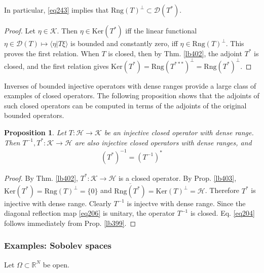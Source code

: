 \documentclass[12pt,b5paper,notitlepage]{article}
\theoremstyle{definition}
\theoremstyle{plain}
\newtheorem{pp}[df]{Proposition}
\newcommand{\ovl}{\overline}
\newcommand{\Dom}{\mathscr{D}}
\newcommand{\bk}[1]{\langle {#1}\rangle}
\newcommand{\Rbb}{\mathbb R}
\newcommand{\Ker}{\mathrm{Ker}}
\newcommand{\Rng}{\mathrm{Rng}}
\newcommand{\MH}{\mathcal H}
\newcommand{\MK}{\mathcal K}
\numberwithin{equation}{section}
\begin{document}
In particular, \eqref{eq243} implies that $\Rng(T)^\perp\subset\Dom(T^*)$.


\begin{proof}
Let $\eta\in\MK$. Then $\eta\in\Ker(T^*)$ iff the linear functional $\eta\in\Dom(T)\mapsto \bk{\eta|T\xi}$ is bounded and constantly zero, iff $\eta\in\Rng(T)^\perp$. This proves the first relation. When $T$ is closed, then by Thm. \ref{lb402}, the adjoint $T^*$ is closed, and the first relation gives $\Ker(T^*)=\Rng(T^{***})^\perp=\Rng(T^*)^\perp$.
\end{proof}


Inverses of bounded injective operators with dense ranges provide a large class of examples of closed operators. The following proposition shows that the adjoints of such closed operators can be computed in terms of the adjoints of the original bounded operators.


\begin{pp}\label{lb404}
Let $T:\MH\rightarrow\MK$ be an injective closed operator with dense range. Then $T^{-1},T^*:\MK\rightarrow\MH$ are also injective closed operators with dense ranges, and
\begin{align}\label{eq204}
(T^*)^{-1}=(T^{-1})^*
\end{align}
\end{pp}

\begin{proof}
By Thm. \ref{lb402}, $T^*:\MK\rightarrow\MH$ is a closed operator. By Prop. \ref{lb403}, $\Ker(T^*)=\Rng(T)^\perp=\{0\}$ and $\ovl{\Rng(T^*)}=\Ker(T)^\perp=\MH$. Therefore $T^*$ is injective with dense range. Clearly $T^{-1}$ is injectve with dense range. Since the diagonal reflection map \eqref{eq206} is unitary, the operator $T^{-1}$ is closed.  Eq. \eqref{eq204} follows immediately from Prop. \ref{lb399}.
\end{proof}



\subsubsection{Examples: Sobolev spaces}\label{lb416}



Let $\Omega\subset\Rbb^N$ be open. 
\end{document}
